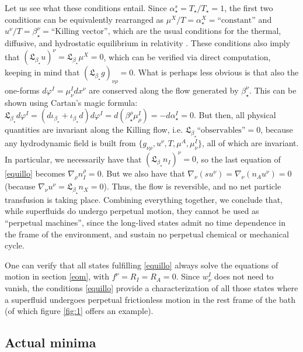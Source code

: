 \documentclass[a4paper, amsfonts, amssymb, amsmath, reprint, showkeys, nofootinbib, twoside,notitlepage,onecolumn]{revtex4-2}
\theoremstyle{definition}
\theoremstyle{theorem}
\theoremstyle{corollary}
\begin{document}
{Let us see what these conditions entail.} Since $\alpha_\star^s=T_\star/T_\star=1$, the first two conditions can be equivalently rearranged as $\mu^X/T=\alpha_\star^X=\text{``constant''}$ and $u^\nu/T=\beta_\star^\nu=\text{``Killing vector''}$, which are the usual conditions for the thermal, diffusive, and hydrostatic equilibrium in relativity \cite{Israel1981}. These conditions also imply that $(\mathfrak{L}_{\beta_\star} u)^\nu =\mathfrak{L}_{\beta_\star}\mu^X=0$, which can be verified via direct computation, keeping in mind that $(\mathfrak{L}_{\beta_\star} g)_{\nu \rho}=0$. What is perhaps less obvious is that also the one-forms $d\varphi^I=\mu_\nu^Idx^\nu$ are conserved along the flow generated by $\beta_\star^\nu$. This can be shown using Cartan's magic formula: $\mathfrak{L}_{\beta_\star}d\varphi^I=(d\iota_{\beta_\star}+\iota_{\beta_\star} d)d\varphi^I=d(\beta_\star^\rho \mu^I_\rho)=-d\alpha_\star^I=0$. But then, all physical quantities are invariant along the Killing flow, i.e. $\mathfrak{L}_{\beta_\star} \text{``observables''}=0$, because any hydrodynamic field is built from $\{g_{\nu \rho},u^\nu,T,\mu^A,\mu^I_\nu\}$, all of which are invariant. In particular, we necessarily have that $(\mathfrak{L}_{\beta_\star} n_I)^\nu=0$, so the last equation of \eqref{equillo} becomes $\nabla_\rho n_I^\rho=0$. But we also have that $\nabla_\nu (su^\nu)=\nabla_\nu (n_A u^\nu)=0$ (because $\nabla_\nu u^\nu=\mathfrak{L}_{\beta_\star} n_X=0$). Thus, the flow is reversible, and no net particle transfusion is taking place. Combining everything together, we conclude that, while superfluids do undergo perpetual motion, they cannot be used as ``perpetual machines'', since the long-lived states admit no time dependence in the frame of the environment, and sustain no perpetual chemical or mechanical cycle. 



One can verify that all states fulfilling \eqref{equillo} always solve the equations of motion in section \ref{eom}, with $f^\nu{=}R_I{=}R_A{=}0$. Since $w_\nu^I$ does not need to vanish, the conditions \eqref{equillo} provide a characterization of all those states where a superfluid undergoes perpetual frictionless motion in the rest frame of the bath (of which figure \ref{fig:1} offers an example).




\subsection{Actual minima}\label{theinfonannnnnnnnn}
\vspace{-0.2cm}
\end{document}

